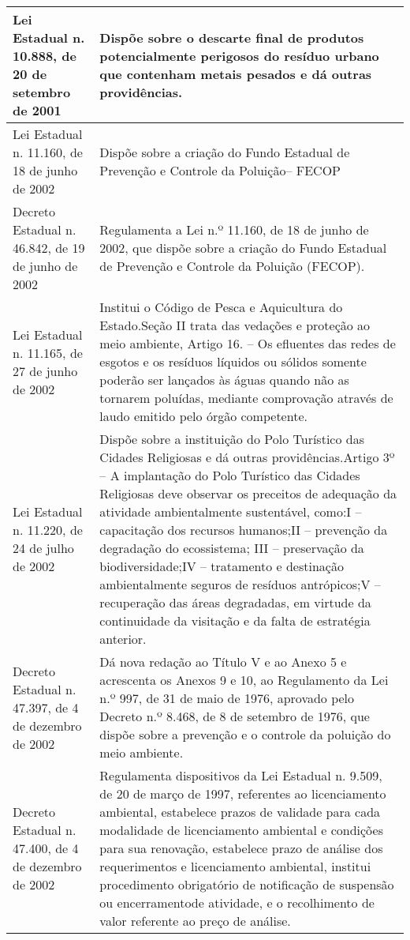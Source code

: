 \begin{center}
\begin{longtable}{|p{}|p{}|}
			\hline
			Lei  Estadual  n.  10.888,  de  20 de setembro de 2001 & Dispõe sobre o descarte final de produtos potencialmente perigosos do resíduo urbano que contenham metais pesados e dá outras providências. \\
			\hline
			Lei  Estadual  n.  11.160,  de  18 de junho de 2002 & Dispõe sobre a criação do Fundo Estadual de Prevenção e Controle da Poluição\newline{}– FECOP \\
			\hline
			Decreto Estadual n. 46.842, de 19 de junho de 2002 & Regulamenta  a  Lei  n.º  11.160,  de  18  de  junho  de  2002,  que  dispõe  sobre  a criação do Fundo Estadual de Prevenção e Controle da Poluição (FECOP). \\
			\hline
			Lei  Estadual  n.  11.165,  de  27 de junho de 2002 & Institui o Código de Pesca e Aquicultura do Estado.\newline{}Seção  II  trata  das  vedações  e  proteção  ao  meio  ambiente,  Artigo  16.  –  Os efluentes  das  redes  de  esgotos  e  os  resíduos  líquidos  ou  sólidos  somente poderão  ser  lançados  às  águas  quando  não  as  tornarem  poluídas,  mediante comprovação através de laudo emitido pelo órgão competente. \\
			\hline
			Lei  Estadual  n.  11.220,  de  24 de julho de 2002 & Dispõe sobre a instituição do Polo Turístico das Cidades Religiosas e dá outras providências.\newline{}Artigo  3º  –  A  implantação  do  Polo  Turístico  das  Cidades  Religiosas  deve observar os preceitos de adequação da atividade ambientalmente sustentável, como:\newline{}I – capacitação dos recursos humanos;\newline{}II – prevenção da degradação do ecossistema; III – preservação da biodiversidade;\newline{}IV – tratamento e destinação ambientalmente seguros de resíduos antrópicos;\newline{}V – recuperação das áreas degradadas, em virtude da continuidade da visitação e da falta de estratégia anterior. \\
			\hline
			Decreto Estadual n. 47.397, de 4 de dezembro de 2002 & Dá nova redação ao Título V e ao Anexo 5 e acrescenta os Anexos 9 e 10, ao Regulamento da Lei n.º 997, de 31 de maio de 1976, aprovado pelo Decreto n.º 8.468, de 8 de setembro de 1976, que dispõe sobre a prevenção e o controle da poluição do meio ambiente. \\
			\hline
			Decreto Estadual n. 47.400, de 4 de dezembro de 2002 & Regulamenta  dispositivos  da Lei  Estadual n.  9.509, de  20 de  março de  1997, referentes ao licenciamento ambiental, estabelece prazos de validade para cada modalidade   de   licenciamento   ambiental   e  condições   para   sua   renovação, estabelece  prazo  de  análise  dos  requerimentos  e  licenciamento  ambiental, institui procedimento obrigatório de notificação de suspensão ou encerramento\newline{}de atividade, e o recolhimento de valor referente ao preço de análise. \\

\end{longtable}
\end{center}
